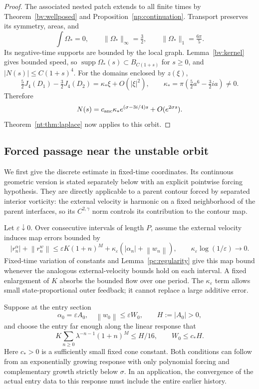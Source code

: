 \documentclass[11pt]{amsart}
\theoremstyle{remark}
\numberwithin{equation}{section}
\newcommand{\norm}[1]{\left\lVert#1\right\rVert}
\begin{document}
\begin{proof}
The associated nested patch extends to all finite times by
Theorem~\ref{bv:wellposed} and Proposition~\ref{np:continuation}.
Transport preserves its symmetry, areas, and
\[
 \int\Omega_*=0,\qquad\|\Omega_*\|_\infty=\tfrac32,
 \qquad\|\Omega_*\|_1=\tfrac{6\pi}{5}.
\]
Its negative-time supports are bounded by the local graph.
Lemma~\ref{bv:kernel} gives bounded speed, so
$\operatorname{supp}\Omega_*(s)\subset B_{C(1+s)}$ for $s\ge0$,
and $|N(s)|\le C(1+s)^4$.
For the domains enclosed by $z(\xi)$,
\[
 \tfrac52J_4(D_1)-\tfrac32J_4(D_2)
       =\kappa_*\xi+O(|\xi|^2),\qquad
 \kappa_*=\pi(\tfrac52a^6-\tfrac32ia)\ne0.
\]
Therefore
\begin{equation}\label{pc:ancient-moment}
 N(s)=c_{\rm anc}\kappa_*e^{(\sigma-3i/4)s}+O(e^{2\sigma s}).
\end{equation}
Theorem~\ref{nt:thm:laplace} now applies to this orbit.
\end{proof}

\subsection{Forced passage near the unstable orbit}
We first give the discrete estimate in fixed-time coordinates. Its continuous geometric version is stated separately below with an explicit pointwise forcing hypothesis. They are directly applicable to a parent contour forced by separated interior vorticity: the external velocity is harmonic on a fixed neighborhood of the parent interfaces, so its $C^{2,\gamma}$ norm controls its contribution to the contour map.

Let $\varepsilon\downarrow0$. Over consecutive intervals of length $P$, assume the external velocity induces map errors bounded by
\begin{equation}\label{pc:force}
 |r^\alpha_n|+\norm{r^w_n}
 \le \varepsilon K(1+n)^M
       +\kappa_\varepsilon (|\alpha_n|+\norm{w_n}),
 \qquad
 \kappa_\varepsilon\log(1/\varepsilon)\longrightarrow0.
\end{equation}
Fixed-time variation of constants and Lemma~\ref{pc:regularity} give this map bound whenever the analogous external-velocity bounds hold on each interval. A fixed enlargement of $K$ absorbs the bounded flow over one period. The $\kappa_\varepsilon$ term allows small state-proportional outer feedback; it cannot replace a large additive error.

Suppose at the entry section
\[
 \alpha_0=\varepsilon A_0,\quad
 \norm{w_0}\le\varepsilon W_0,
 \qquad H:=|A_0|>0,
\]
and choose the entry far enough along the linear response that
\begin{equation}\label{pc:margin}
 K\sum_{n\ge0}\lambda^{-n-1}(1+n)^M\le H/16,
 \qquad W_0\le c_* H.
\end{equation}
Here $c_*>0$ is a sufficiently small fixed cone constant. Both conditions can follow from an exponentially growing response with only polynomial forcing and complementary growth strictly below $\sigma$. In an application, the convergence of the actual entry data to this response must include the entire earlier history.
\end{document}
